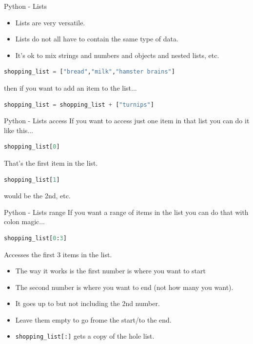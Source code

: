 \documentclass[fleqn,11pt,aspectratio=43]{beamer}
\begin{document}
\begin{frame}[fragile]{Python - Lists}
\begin{itemize}
  \item Lists are very versatile.
  \item Lists do not all have to contain the same type of data. 
  \item It's ok to mix strings and numbers and objects and nested lists, etc.
\end{itemize}
\begin{lstlisting}[language=python]
shopping_list = ["bread","milk","hamster brains"]
\end{lstlisting}

then if you want to add an item to the list...
\begin{lstlisting}[language=python]
shopping_list = shopping_list + ["turnips"]
\end{lstlisting}

\end{frame}

\begin{frame}[fragile]{Python - Lists access}
If you want to access just one item in that list you can do it like this...
\begin{lstlisting}[language=python]
shopping_list[0]
\end{lstlisting}
That's the first item in the list. 
\begin{lstlisting}[language=python]
shopping_list[1]
\end{lstlisting}
would be the 2nd, etc.
\end{frame}

\begin{frame}[fragile]{Python - Lists range}
If you want a range of items in the list you can do that with colon magic...
\begin{lstlisting}[language=python]
shopping_list[0:3]
\end{lstlisting}
Accesses the first 3 items in the list. 
\begin{itemize}
  \item The way it works is the first number is where you want to start
  \item The second number is where you want to end (not how many you want).
  \item It goes up to but not including the 2nd number.
  \item Leave them empty to go frome the start/to the end.
  \item {\tt shopping\_list[:]} gets a copy of the hole list.
\end{itemize}
\end{frame}
\end{document}

